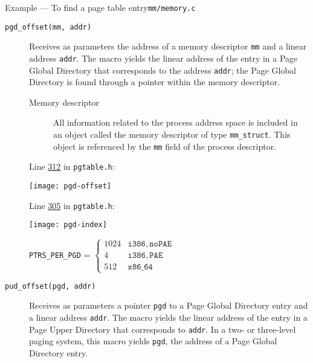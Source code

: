 \begin{frame}{Example --- To find a page table entry}{\texttt{mm/memory.c}}
  \begin{center}
  \end{center}
\end{frame}

\begin{description}
\item[\texttt{pgd\_offset(mm, addr)}] Receives as parameters the address of a memory
  descriptor \texttt{mm}  and a linear address \texttt{addr}. The macro yields
  the linear address of the entry in a Page Global Directory that corresponds to the
  address \texttt{addr}; the Page Global Directory is found through a pointer within the
  memory descriptor.
  \begin{description}
  \item[Memory descriptor]  All information related to the process address
    space is included in an object called the memory descriptor of type
    \texttt{mm\_struct}. This object is referenced by the \texttt{mm} field of the process
    descriptor.
  \end{description}

  Line \href{http://lxr.linux.no/linux+v2.6.11/include/asm-i386/pgtable.h\#L312}{312} in
  \texttt{pgtable.h}:
  \begin{center}
    \texttt{[image: pgd-offset]}
  \end{center}

  Line \href{http://lxr.linux.no/linux+v2.6.11/include/asm-i386/pgtable.h\#L305}{305} in 
  \texttt{pgtable.h}:
  \begin{center}
    \texttt{[image: pgd-index]}
  \end{center}

  \texttt{PTRS\_PER\_PGD} = $ \begin{cases}
    1024&\mathtt{i386, noPAE}\\
    4&\mathtt{i386, PAE}\\
    512&\mathtt{x86\_64}
  \end{cases}$

\item[\texttt{pud\_offset(pgd, addr)}] Receives as parameters a pointer \texttt{pgd} to a Page
  Global Directory entry and a linear address \texttt{addr}. The macro yields the linear
  address of the entry in a Page Upper Directory that corresponds to \texttt{addr}. In a
  two- or three-level paging system, this macro yields \texttt{pgd}, the address of a Page
  Global Directory entry.


\end{description}
